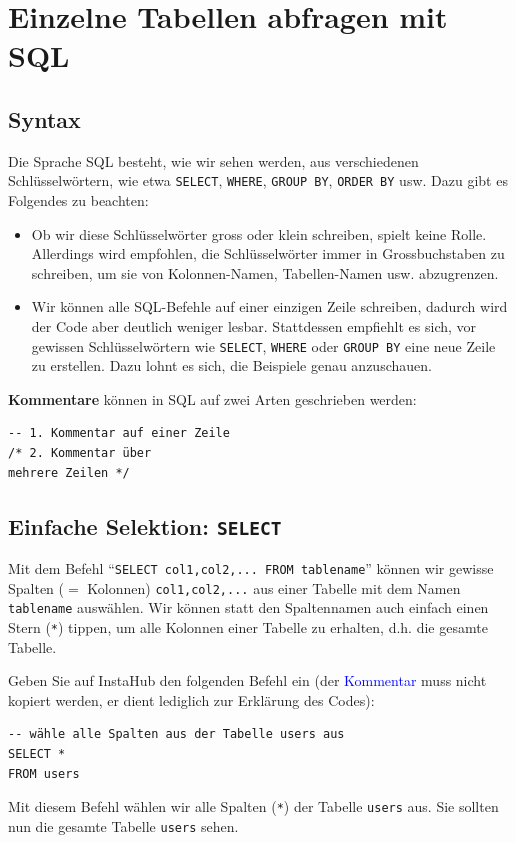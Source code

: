 \section{Einzelne Tabellen abfragen mit \texorpdfstring{\gls{SQL}}{SQL}}

\subsection{Syntax}
Die Sprache \acrfull{SQL} besteht, wie wir sehen werden, aus verschiedenen Schlüsselwörtern, wie etwa \lstinline|SELECT|, \lstinline|WHERE|, \lstinline|GROUP BY|, \lstinline|ORDER BY| usw. Dazu gibt es Folgendes zu beachten:
\begin{itemize}
  \item Ob wir diese Schlüsselwörter gross oder klein schreiben, spielt keine Rolle. Allerdings wird empfohlen, die Schlüsselwörter immer in Grossbuchstaben zu schreiben, um sie von Kolonnen-Namen, Tabellen-Namen usw. abzugrenzen.
  \item Wir können alle \gls{SQL}-Befehle auf einer einzigen Zeile schreiben, dadurch wird der Code aber deutlich weniger lesbar. Stattdessen empfiehlt es sich, vor gewissen Schlüsselwörtern wie \lstinline|SELECT|, \lstinline|WHERE| oder \lstinline|GROUP BY| eine neue Zeile zu erstellen. Dazu lohnt es sich, die Beispiele genau anzuschauen.
\end{itemize}

\textbf{Kommentare} können in \gls{SQL}  auf zwei Arten geschrieben werden:

\begin{lstlisting}
-- 1. Kommentar auf einer Zeile
/* 2. Kommentar über
mehrere Zeilen */
\end{lstlisting}

\subsection{Einfache Selektion: \texorpdfstring{\lstinline|SELECT|}{SELECT}}

Mit dem Befehl \enquote{\lstinline|SELECT col1,col2,... FROM tablename|} können wir gewisse Spalten ($=$ Kolonnen) \lstinline|col1,col2,...| aus einer Tabelle mit dem Namen \lstinline|tablename| auswählen. Wir können statt den Spaltennamen auch einfach einen Stern (\texttt{*}) tippen, um alle Kolonnen einer Tabelle zu erhalten, d.h. die gesamte Tabelle.


\begin{myexample}
Geben Sie auf InstaHub den folgenden Befehl ein (der \textcolor{blue}{Kommentar} muss nicht kopiert werden, er dient lediglich zur Erklärung des Codes):

\begin{lstlisting}
-- wähle alle Spalten aus der Tabelle users aus
SELECT *
FROM users
\end{lstlisting}

Mit diesem Befehl wählen wir alle Spalten (\lstinline|*|) der Tabelle \lstinline|users| aus.
Sie sollten nun die gesamte Tabelle \texttt{users} sehen.
\end{myexample}

